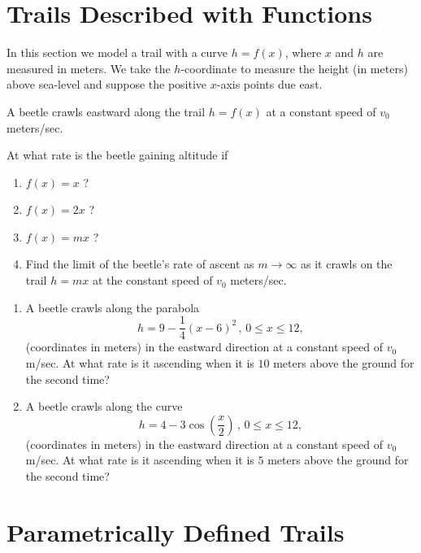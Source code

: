 \documentclass{ximera}
\begin{document}
\section{Trails Described with Functions}

In this section we model a trail with a curve $h=f(x)$, where $x$ and $h$ are measured in meters. We take the $h$-coordinate to measure the height (in meters) above sea-level and suppose the positive $x$-axis points due east.

\begin{question}  \label{QOideIIEIEII}
A beetle crawls eastward along the trail $h = f(x)$ at a constant speed of $v_0$ meters/sec.

At what rate is the beetle gaining altitude if

\begin{enumerate}
\item $f(x) = x$ ?

\item $f(x)=2x$ ?

\item $f(x) = mx$ ? 

\item Find the limit of the beetle's rate of ascent as $m\to \infty$ as it crawls on the trail $h=mx$ at the constant speed of $v_0$ meters/sec.
\end{enumerate}
 
\end{question}

\begin{question}  \label{QPeriERE}
\begin{enumerate}

\item A beetle crawls along the parabola
\[
     h = 9-\frac{1}{4}\left(x-6\right)^{2} \, , \, 0\leq x \leq 12,
\]
(coordinates in meters) in the eastward direction at a constant speed of $v_0$ m/sec. At what rate is it ascending when it is $10$ meters above the ground for the second time?

\item A beetle crawls along the curve
\[
     h =4-3\cos\left(\frac{x}{2}\right) \, , \, 0\leq x \leq 12,
\]
(coordinates in meters) in the eastward direction at a constant speed of $v_0$ m/sec. At what rate is it ascending when it is $5$ meters above the ground for the second time?

\end{enumerate}

\end{question}




\section{Parametrically Defined Trails}
\end{document}

